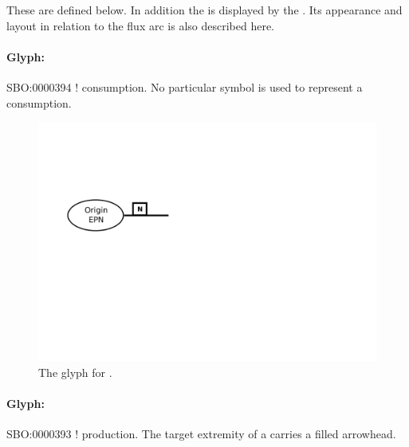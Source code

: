 These are defined below. In addition the  is
displayed by the . Its appearance and
layout in relation to the flux arc is also described here.

\paragraph{Glyph: }
\label{sec:consumption}

\begin{glyphDescription}
 \glyphSboTerm SBO:0000394 ! consumption.
 \glyphEndPoint No particular symbol is used to represent a consumption.
\end{glyphDescription}


\begin{figure}[H]
  \centering
  \includegraphics[scale = 0.4]{images/consumption}
  \caption{The \PD glyph for .}
  \label{fig:consumption}
\end{figure}

\paragraph{Glyph: }\label{sec:production}

\begin{glyphDescription}
 \glyphSboTerm SBO:0000393 ! production.
 \glyphEndPoint The target extremity of a  carries a filled arrowhead.
 \end{glyphDescription}

